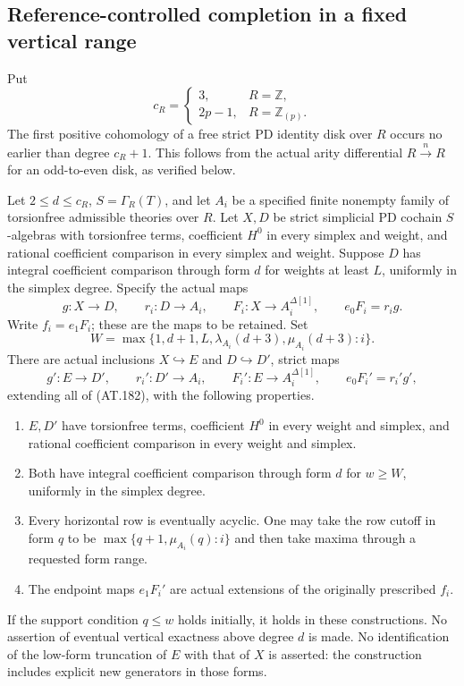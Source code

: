 \subsection{Reference-controlled completion in a fixed vertical range}

Put
\[
 c_R=
 \begin{cases}
 3,&R=\mathbb Z,\\
 2p-1,&R=\mathbb Z_{(p)}.
 \end{cases}
 \tag{AT.181}
\]
The first positive cohomology of a free strict PD
identity disk over $R$ occurs no earlier than
degree $c_R+1$. This follows from the actual
arity differential $R\xrightarrow{n}R$ for an
odd-to-even disk, as verified below.

\begin{theorem}
\label{AT27}
Let $2\leq d\leq c_R$, $S=\Gamma_R(T)$, and let
$A_i$ be a specified finite nonempty family of
torsionfree admissible theories over $R$.
Let $X,D$ be strict simplicial PD cochain
$S$-algebras with torsionfree terms, coefficient
$H^0$ in every simplex and weight, and rational
coefficient comparison in every simplex and weight.
Suppose $D$ has integral coefficient comparison
through form $d$ for weights at least $L$, uniformly
in the simplex degree.
Specify the actual maps
\[
 g:X\longrightarrow D,\qquad r_i:D\longrightarrow A_i,
 \qquad F_i:X\longrightarrow A_i^{\Delta[1]},
 \qquad e_0F_i=r_i g .
 \tag{AT.182}
\]
Write $f_i=e_1F_i$; these are the maps to be retained.
Set
\[
 W=\max\bigl\{1,d+1,L,\lambda_{A_i}(d+3),
                              \mu_{A_i}(d+3):i\bigr\}.
 \tag{AT.183}
\]
There are actual inclusions $X\hookrightarrow E$ and
$D\hookrightarrow D'$, strict maps
\[
 g':E\longrightarrow D',\qquad r_i':D'\longrightarrow A_i,
 \qquad F_i':E\longrightarrow A_i^{\Delta[1]},
 \qquad e_0F_i'=r_i'g',
 \tag{AT.184}
\]
extending all of (AT.182), with the following properties.
\begin{enumerate}
\item $E,D'$ have torsionfree terms, coefficient
      $H^0$ in every weight and simplex, and rational
      coefficient comparison in every weight and simplex.
\item Both have integral coefficient comparison
      through form $d$ for $w\geq W$, uniformly
      in the simplex degree.
\item Every horizontal row is eventually acyclic.
      One may take the row cutoff in form $q$ to be
      $\max\{q+1,\mu_{A_i}(q):i\}$ and then take
      maxima through a requested form range.
\item The endpoint maps $e_1F_i'$ are actual
      extensions of the originally prescribed $f_i$.
\end{enumerate}
If the support condition $q\leq w$ holds initially,
it holds in these constructions.
No assertion of eventual vertical exactness above
degree $d$ is made.
No identification of the low-form truncation of
$E$ with that of $X$ is asserted: the construction
includes explicit new generators in those forms.
\end{theorem}

